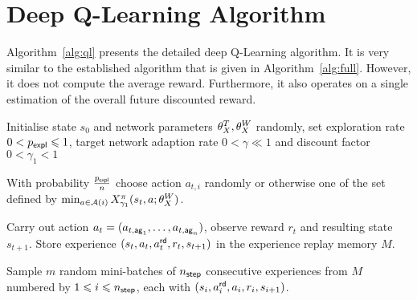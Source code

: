 \documentclass[envcountsame]{llncs}
\newcommand\MS[2][r]{\ifx t#1 \textcolor{blue}{[\textbf{MS:} #2]}
  \else \begin{center}\textcolor{blue}{\textbf{MS:} #2} \end{center} \fi}
\begin{document}



\vfill
\pagebreak[4!]
\appendix

\section{Deep Q-Learning Algorithm}

Algorithm~\ref{alg:ql} presents the detailed deep Q-Learning algorithm. It is very similar to the
established \ARA{} algorithm that is given in Algorithm~\ref{alg:full}. However, it does not compute
the average reward. Furthermore, it also operates on a single estimation of the overall future
discounted reward.

\begin{algorithm}[h!]
  \begin{algorithmic}[1]
    \State{}Initialise state \(s_{0}\) and network parameters \(\theta_X^{T}, \theta_X^{W}\) randomly,
    set exploration rate \(0 < p_{\mathsf{expl}} \leqslant 1\), target network adaption rate
    \(0 < \gamma \ll 1\) and discount factor \(0 < \gamma_{1} < 1\)
      \State{}%
    \begin{minipage}[t]{\dimexpr\textwidth-\leftmargin-\labelsep-\labelwidth-\leftmargin+2pt}
      With probability \(\frac{p_{\mathsf{expl}}}{n}\) choose action \(a_{t,i}\) randomly or otherwise one of
      the set defined by
      \(\min_{a \in \mathcal{A}(i)}X^{\pi}_{\gamma_{1}}(s_{t},a; \theta_X^{W}{})\).
    \end{minipage}
    \EndFor{}
    \State{}%
    \begin{minipage}[t]{\dimexpr\textwidth-\leftmargin-\labelsep-\labelwidth}
      Carry out action \(a_{t}=(a_{t,\mathsf{ag}_{1}},\ldots,a_{t,\mathsf{ag}_{n}})\), observe reward
      \(r_{t}\) and resulting state \(s_{t+1}\). Store experience
      \((s_{t}, a_{t}, a_{t}^{\mathsf{rd}}, r_{t}, s_{t+1})\) in the experience replay memory \(M\).
    \end{minipage}
    \State{}%
    \begin{minipage}[t]{\dimexpr\textwidth-\leftmargin-\labelsep-\labelwidth-\leftmargin+2pt}
      Sample \(m\) random mini-batches of \(n_{\mathsf{step}}\) consecutive experiences from \(M\) numbered by
      \(1 \leqslant i \leqslant n_{\mathsf{step}}\), each with
      \((s_{i}, a_{i}^{\mathsf{rd}}, a_{i}, r_{i}, s_{i+1})\).

\end{minipage}
\end{algorithmic}
\end{algorithm}
\end{document}

